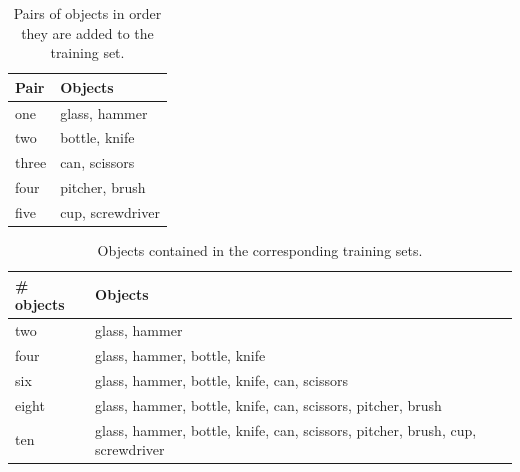 \begin{table}
	\centering
	\begin{tabular}{l | l}
		\hline
		Pair  & Objects \\ \hline
		one   & glass, hammer \\
		two   & bottle, knife \\
		three & can, scissors \\
		four  & pitcher, brush \\
		five  & cup, screwdriver \\
		\hline
	\end{tabular}
	\caption{Pairs of objects in order they are added to the training set.}
	\label{tab:obj_pairs}
\end{table}

\begin{table}
	\centering
	\begin{tabular}{l | p{8cm}}
		\hline
		\# objects & Objects \\ \hline
		two   & glass, hammer \\
		four  & glass, hammer, bottle, knife \\
		six   & glass, hammer, bottle, knife, can, scissors \\
		eight & glass, hammer, bottle, knife, can, scissors, pitcher, brush \\
		ten   & glass, hammer, bottle, knife, can, scissors, pitcher, brush, cup, screwdriver \\
		\hline
	\end{tabular}
	\caption{Objects contained in the corresponding training sets.}
	\label{tab:obj_training_sets}
\end{table}

